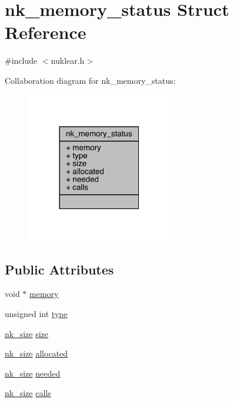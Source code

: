 \hypertarget{structnk__memory__status}{}\section{nk\+\_\+memory\+\_\+status Struct Reference}
\label{structnk__memory__status}


{\ttfamily \#include $<$nuklear.\+h$>$}



Collaboration diagram for nk\+\_\+memory\+\_\+status\+:
\nopagebreak
\begin{figure}[H]
\begin{center}
\leavevmode
\includegraphics[width=180pt]{structnk__memory__status__coll__graph}
\end{center}
\end{figure}
\subsection*{Public Attributes}
\begin{DoxyCompactItemize}
\item 
void $\ast$ \mbox{\hyperlink{structnk__memory__status_a59d1cb36709894b5f922a1d4cf057051}{memory}}
\item 
unsigned int \mbox{\hyperlink{structnk__memory__status_a68c5a40b0c4f683e78c64301f5ab319b}{type}}
\item 
\mbox{\hyperlink{nuklear_8h_a84c0fc50dec5501be327b33d41d9010c}{nk\+\_\+size}} \mbox{\hyperlink{structnk__memory__status_afff8181f79734681fbe2f240e866dae1}{size}}
\item 
\mbox{\hyperlink{nuklear_8h_a84c0fc50dec5501be327b33d41d9010c}{nk\+\_\+size}} \mbox{\hyperlink{structnk__memory__status_a3fc6ed3975955adc725902ef3202eda5}{allocated}}
\item 
\mbox{\hyperlink{nuklear_8h_a84c0fc50dec5501be327b33d41d9010c}{nk\+\_\+size}} \mbox{\hyperlink{structnk__memory__status_a1dcfdb12316a8b864595d23839ef7072}{needed}}
\item 
\mbox{\hyperlink{nuklear_8h_a84c0fc50dec5501be327b33d41d9010c}{nk\+\_\+size}} \mbox{\hyperlink{structnk__memory__status_a9ccd108a6be26c752346353c81dafcd8}{calls}}
\end{DoxyCompactItemize}


